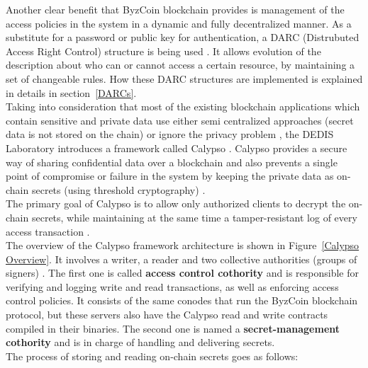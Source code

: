 \newline
Another clear benefit that ByzCoin \cite{ByzCoin} blockchain provides is management of the access policies in the system in a dynamic and fully decentralized manner. As a substitute for a password or public key for authentication, a DARC (Distrubuted Access Right Control) structure is being used \cite{Darc}. It allows evolution of the description about who can or cannot access a certain resource, by maintaining a set of changeable rules. How these DARC structures are implemented is explained in details in section~\ref{DARCs}.\\
\newline
Taking into consideration that most of the existing blockchain applications which contain sensitive and private data use either semi centralized approaches (secret data is not stored on the chain) \cite{Medical Data, Calypso} or ignore the privacy problem \cite{Privacy, Calypso}, the DEDIS Laboratory introduces a framework called Calypso \cite{Calypso}. Calypso provides a secure way of sharing confidential data over a blockchain and also prevents a single point of compromise or failure in the system by
keeping the private data as on-chain secrets (using threshold cryptography) \cite{Calypso}.\\
\newline
The primary goal of Calypso is to allow only authorized clients to decrypt the on-chain secrets, while maintaining at the same time a tamper-resistant log of every access transaction \cite{Calypso}.\\
\newline
The overview of the Calypso framework architecture is shown in Figure~\ref{Calypso Overview}. It involves a writer, a reader and two collective authorities (groups of signers) \cite{CoSi}.
\newline
The first one is called \textbf{access control cothority} and is responsible for verifying and logging write and read transactions, as well as enforcing access control policies. It consists of the same conodes that run the ByzCoin blockchain protocol, but these servers also have the Calypso read and write contracts compiled in their binaries.
\newline
The second one is named a \textbf{secret-management cothority} and is in charge of handling and delivering secrets.\\
\newline
The process of storing and reading on-chain secrets goes as follows:
\newline
